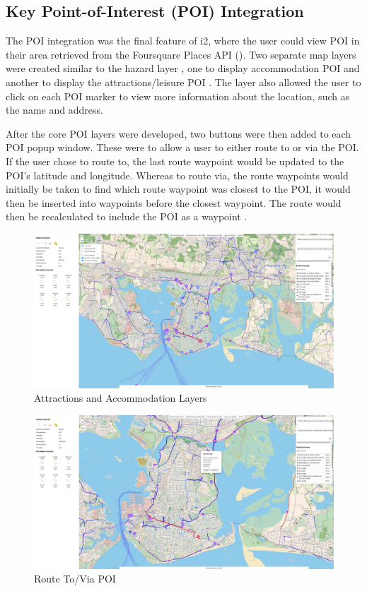 \subsection{Key Point-of-Interest (POI) Integration}
\label{iteration2:poi-integration}

The POI integration was the final feature of i2, where the user could view POI in their area retrieved from the Foursquare Places API (\cite{noauthor_places_nodate}). Two separate map layers were created similar to the hazard layer , one to display accommodation POI and another to display the attractions/leisure POI . The layer also allowed the user to click on each POI marker to view more information about the location, such as the name and address.

After the core POI layers were developed, two buttons were then added to each POI popup window. These were to allow a user to either route to or via the POI. If the user chose to route to, the last route waypoint would be updated to the POI's latitude and longitude. Whereas to route via, the route waypoints would initially be taken to find which route waypoint was closest to the POI, it would then be inserted into waypoints before the closest waypoint. The route would then be recalculated to include the POI as a waypoint .

\begin{figure}[!ht]
  \centering
  \includegraphics[width=425px]{figures/Progress Images/Iteration-2/SR40-45/SR40 - Attractions and Accommodation KeyPOI.png}
  \caption{Attractions and Accommodation Layers}
  \label{fig:poi-layers}
\end{figure}

\begin{figure}[!ht]
  \centering
  \includegraphics[width=425px]{figures/Progress Images/Iteration-2/SR40-45/SR45 - Route ToVia POI.png}
  \caption{Route To/Via POI}
  \label{fig:poi-route}
\end{figure}

